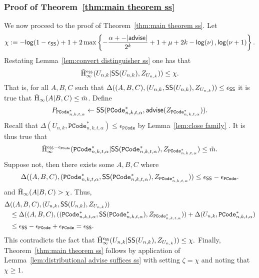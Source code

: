\subsubsection{Proof of Theorem~\ref{thm:main theorem ss}}
We now proceed to the proof of Theorem~\ref{thm:main theorem ss}.   Let \[\chi:= -\mathsf{log}\!\left(1-\epsilon_{\mathsf{SS}}\right) +1 + 2\max\left\{-\frac{\alpha+-|{\mathsf{advise}}|}{2^k}+1+\mu+2k-\mathsf{log}\!\left(\nu\right), \mathsf{log}\!\left(\nu+1\right)\right\}.\]  Restating Lemma~\ref{lem:convert distinguisher ss} one has that 
\[
\tilde{\mathrm{H}}_\infty^{\epsilon_{\mathsf{SS}}}(U_{n,k} | {\mathsf{SS}}(U_{n,k}), Z_{U_{n,k}})) \le \chi.
\]
That is, for all $A, B, C$ such that $\Delta((A, B, C), (U_{n,k},{\mathsf{SS}}(U_{n,k}), Z_{U_{n,k}}))\le \epsilon_{{\mathsf{SS}}}$ it is true that $\tilde{\mathrm{H}}_\infty(A|B, C) \le \tilde{m}$.  Define \[P_{\mathtt{PCode}_{n, k, t, \alpha}^{*}}\leftarrow {\ensuremath{\mathsf{SS}}}(\mathtt{PCode}_{n, k, t, \alpha}^{*}, {\mathsf{advise}}(Z_{\mathtt{PCode}_{n, k, t, \alpha}^{*}})).\]
Recall that $\Delta(U_{n,k}, \mathtt{PCode}_{n, k, t, \alpha}^{*}) \le \epsilon_{\mathtt{PCode}}$ by Lemma~\ref{lem:close family} .  
It is thus true that 
\[
\tilde{\mathrm{H}}_\infty^{\epsilon_{{\mathsf{SS}}}-\epsilon_{\mathtt{PCode}}}(\mathtt{PCode}_{n, k, t, \alpha}^{*} | {\mathsf{SS}}(\mathtt{PCode}_{n, k, t, \alpha}^{*}), Z_{\mathtt{PCode}_{n, k, t, \alpha}^{*}})\le \tilde{m}.
\]
Suppose not, then there exists some $A, B, C$ where 
\[
\Delta((A, B, C), (\mathtt{PCode}_{n, k, t, \alpha}^{*} , {\mathsf{SS}}(\mathtt{PCode}_{n, k, t, \alpha}^{*}), Z_{\mathtt{PCode}_{n, k, t, \alpha}^{*}}))\le \epsilon_{{\mathsf{SS}}}-\epsilon_{\mathtt{PCode}}.
\]
and $\tilde{\mathrm{H}}_\infty(A|B, C)>\chi$.
Thus, 
\begin{align*}
\Delta&((A, B, C), (U_{n,k},{\mathsf{SS}}(U_{n,k}), Z_{U_{n,k}}))\\&\le \Delta((A, B, C), ((\mathtt{PCode}_{n, k, t, \alpha}^{*} , {\mathsf{SS}}(\mathtt{PCode}_{n, k, t, \alpha}^{*}), Z_{\mathtt{PCode}_{n, k, t, \alpha}^{*}}))+\Delta(U_{n,k}, \mathtt{PCode}_{n, k, t, \alpha}^{*})\\
&\le \epsilon_{{\mathsf{SS}}}-\epsilon_{\mathtt{PCode}}+ \epsilon_{\mathtt{PCode}} = \epsilon_{{\mathsf{SS}}}.
\end{align*}
This contradicts the fact that $\tilde{\mathrm{H}}_\infty^{\epsilon_{\mathsf{SS}}}(U_{n,k} | {\mathsf{SS}}(U_{n,k}), Z_{U_{n,k}})) \le \chi.$
Finally, Theorem~\ref{thm:main theorem ss} follows by application of Lemma~\ref{lem:distributional advise suffices ss} with setting $\zeta = \chi$ and noting that $\chi\ge 1$.





